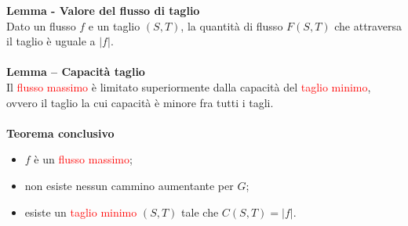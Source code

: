 \documentclass[../cheatSheetAlgoritmi.tex]{subfiles}
\begin{document}
\textbf{Lemma - Valore del flusso di taglio} \\
Dato un flusso $f$ e un taglio $(S,T)$, la quantità di flusso $F(S,T)$ che attraversa il taglio è uguale a $|f|$. \\\\
\textbf{Lemma – Capacità taglio} \\
Il \textcolor{red}{flusso massimo} è limitato superiormente dalla capacità del \textcolor{red}{taglio minimo}, ovvero il taglio la cui capacità è minore fra tutti i tagli. \\\\
\textbf{Teorema conclusivo}
\begin{itemize}
	\item $f$ è un \textcolor{red}{flusso massimo};
	\item non esiste nessun cammino aumentante per $G$;
	\item esiste un \textcolor{red}{taglio minimo} $(S, T)$ tale che $C(S, T) = |f|$.
\end{itemize}
\end{document}
